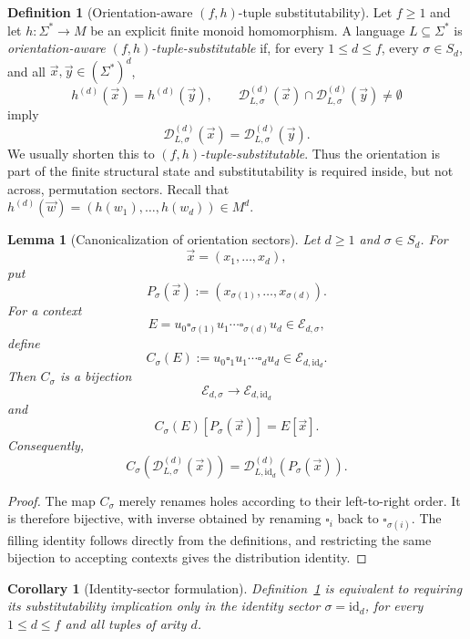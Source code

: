 \documentclass[11pt,a4paper]{article}
\numberwithin{equation}{section}
\theoremstyle{plain}
\newtheorem{lemma}[theorem]{Lemma}
\newtheorem{corollary}[theorem]{Corollary}
\theoremstyle{definition}
\newtheorem{definition}[theorem]{Definition}
\theoremstyle{remark}
\newcommand{\D}{\mathcal{D}}
\newcommand{\tuple}[1]{\vec{#1}}
\newcommand{\blank}{\square}
\begin{document}
\begin{definition}[Orientation-aware \((f,h)\)-tuple substitutability]
\label{def:tuple-substitutable}
Let \(f\ge1\) and let \(h\colon\Sigma^*\to M\) be an explicit finite monoid
homomorphism.  A language \(L\subseteq\Sigma^*\) is
\emph{orientation-aware \((f,h)\)-tuple-substitutable} if, for every
\(1\le d\le f\), every \(\sigma\in S_d\), and all
\(\tuple x,\tuple y\in(\Sigma^*)^d\),
\[
 h^{(d)}(\tuple x)=h^{(d)}(\tuple y),\qquad
 \D_{L,\sigma}^{(d)}(\tuple x)\cap
 \D_{L,\sigma}^{(d)}(\tuple y)\ne\emptyset
\]
imply
\[
  \D_{L,\sigma}^{(d)}(\tuple x)
  =\D_{L,\sigma}^{(d)}(\tuple y).
\]
We usually shorten this to \emph{\((f,h)\)-tuple-substitutable}.  Thus the
orientation is part of the finite structural state and substitutability is
required inside, but not across, permutation sectors.  Recall that
\(h^{(d)}(\tuple w)=(h(w_1),\ldots,h(w_d))\in M^d\).
\end{definition}

\begin{lemma}[Canonicalization of orientation sectors]
\label{lem:sector-canonicalization}
Let \(d\ge1\) and \(\sigma\in S_d\).  For
\[
  \tuple x=(x_1,\ldots,x_d),
\]
put
\[
  P_\sigma(\tuple x):=(x_{\sigma(1)},\ldots,x_{\sigma(d)}).
\]
For a context
\[
  E=u_0\blank_{\sigma(1)}u_1\cdots\blank_{\sigma(d)}u_d
  \in\mathcal E_{d,\sigma},
\]
define
\[
  C_\sigma(E):=u_0\blank_1u_1\cdots\blank_du_d
  \in\mathcal E_{d,\mathrm{id}_d}.
\]
Then \(C_\sigma\) is a bijection
\[
  \mathcal E_{d,\sigma}\longrightarrow\mathcal E_{d,\mathrm{id}_d}
\]
and
\[
  C_\sigma(E)[P_\sigma(\tuple x)]=E[\tuple x].
\]
Consequently,
\[
  C_\sigma\!\left(\D_{L,\sigma}^{(d)}(\tuple x)\right)
  =
  \D_{L,\mathrm{id}_d}^{(d)}\!\left(P_\sigma(\tuple x)\right).
\]
\end{lemma}

\begin{proof}
The map \(C_\sigma\) merely renames holes according to their left-to-right
order.  It is therefore bijective, with inverse obtained by renaming
\(\blank_i\) back to \(\blank_{\sigma(i)}\).  The filling identity follows
directly from the definitions, and restricting the same bijection to
accepting contexts gives the distribution identity.
\end{proof}

\begin{corollary}[Identity-sector formulation]
\label{cor:identity-sector-equivalence}
Definition~\ref{def:tuple-substitutable} is equivalent to requiring its
substitutability implication only in the identity sector
\(\sigma=\mathrm{id}_d\), for every \(1\le d\le f\) and all tuples of
arity \(d\).
\end{corollary}
\end{document}
